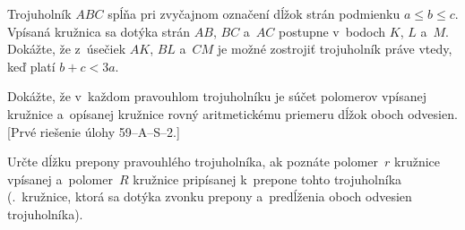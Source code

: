 {Trojuholník $ABC$ spĺňa pri zvyčajnom
označení dĺžok strán podmienku $a\le b\le c$.
Vpísaná kružnica sa dotýka strán $AB$,
$BC$ a~$AC$ postupne v~bodoch $K$,
$L$ a~$M$. Dokážte, že z~úsečiek
$AK$, $BL$ a~$CM$ je možné zostrojiť trojuholník
práve vtedy, keď platí $b+c<3a$.
\vpravo{[57--C--II--1]}

Dokážte, že v~každom pravouhlom trojuholníku je súčet polomerov
vpísanej kružnice a~opísanej kružnice rovný aritmetickému priemeru dĺžok oboch
odvesien. [Prvé riešenie úlohy 59--A--S--2.]

Určte dĺžku prepony pravouhlého trojuholníka, ak poznáte
polomer~$r$ kružnice vpísanej a~polomer~$R$ kružnice pripísanej
k~prepone tohto trojuholníka (\tj.~kružnice, ktorá sa dotýka
zvonku prepony a~predĺženia oboch odvesien
trojuholníka).
\vpravo{[45--C--I--6]}
}

